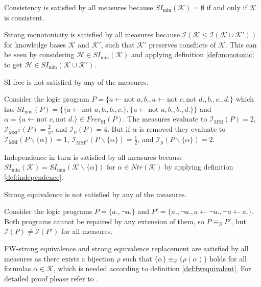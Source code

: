 Consistency is satisfied by all measures because \(SI_{\min}(\mathcal{K}) = \emptyset\) if and only if \(\mathcal{K}\) is consistent.

Strong monotonicity is satisfied by all measures because \(\mathcal{I}(\mathcal{K} \leq \mathcal{I}(\mathcal{K} \cup \mathcal{K}'))\) for knowledge bases \(\mathcal{K}\) and \(\mathcal{K}'\), such that \(\mathcal{K}'\) preserves consflicts of \(\mathcal{K}\). This can be seen by considering \(\mathcal{H} \in SI_{\min}(\mathcal{K})\) and applying definition \ref{def:monotonic} to get \(\mathcal{H} \in SI_{\min}(\mathcal{K} \cup \mathcal{K}')\).

SI-free is not satisfied by any of the measures.
\begin{example}
    Consider the logic program \(P = \{a \leftarrow \text{not } a, b., a \leftarrow \text{not }c, \text{not }d., b., c., d.\}\) which has \(SI_{\min}(P) = \{\{a \leftarrow \text{not }a,b., b., c.\}, \{a \leftarrow \text{not }a, b., b., d.\}\}\) and \(\alpha = \{a \leftarrow \text{not }c, \text{not }d.\} \in Free_{\text{SI}}(P)\). The measures evaluate to \(\mathcal{I}_{\text{MSI}}(P) = 2\), \(\mathcal{I}_{\text{MSI}^\text{C}}(P) = \frac{2}{3}\), and \(\mathcal{I}_{\text{p}}(P) = 4\). But if \(\alpha\) is removed they evaluate to \(\mathcal{I}_{\text{MSI}}(P \backslash \{\alpha\}) = 1\), \(\mathcal{I}_{\text{MSI}^\text{C}}(P \backslash \{\alpha\}) = \frac{1}{2}\), and \(\mathcal{I}_{\text{p}}(P \backslash \{\alpha\}) = 2\).
\end{example}

Independence in turn is satisfied by all measures because \(SI_{\min}(\mathcal{K}) = SI_{\min}(\mathcal{K} \backslash \{\alpha\})\) for \(\alpha \in Ntr(\mathcal{K})\) by applying definition \ref{def:independence}.

Strong equivalence is not satisfied by any of the measures.
\begin{example}
    Consider the logic programs \(P = \{a., \neg a.\}\) and \(P' = \{a., \neg a., a \leftarrow \neg a., \neg a \leftarrow a.\}\). Both programs cannot be repaired by any extension of them, so \(P \equiv_S P'\), but \(\mathcal{I}(P) \neq \mathcal{I}(P')\) for all measures.
\end{example}

FW-strong equivalence and strong equivalence replacement are satisfied by all measures as there exists a bijection \(\rho\) such that \(\{\alpha\} \equiv_S \{\rho(\alpha)\}\) holds for all formulas \(\alpha \in \mathcal{K}\), which is needed according to definition \ref{def:fwequivalent}. For detailed proof please refer to \cite{ulbricht_handling_2020}.

